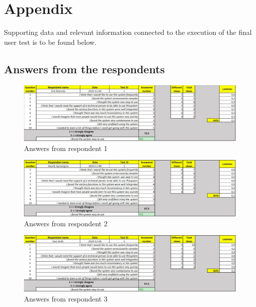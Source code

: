 \documentclass[12pt]{article}
\begin{document}
    
    
    
    
    \section{Appendix}
    Supporting data and relevant information connected to the execution of the final user test is to be found below. 
    \subsection{Answers from the respondents}
    \label{sec: Answers}
    \begin{figure}[H]
        \centering
        \includegraphics[width=\linewidth]{Pictures/Usertest_1.JPG}
        \caption{Answers from respondent 1}
        \label{fig:Usertest_1}
    \end{figure}
    \begin{figure}[H]
        \centering
        \includegraphics[width=\linewidth]{Pictures/Usertest_2.JPG}
        \caption{Answers from respondent 2}
        \label{fig:Usertest_2}
    \end{figure}
    \begin{figure}[H]
        \centering
        \includegraphics[width=\linewidth]{Pictures/Usertest_3.JPG}
        \caption{Answers from respondent 3}
        \label{fig:Usertest_3}
    \end{figure}
\end{document}
